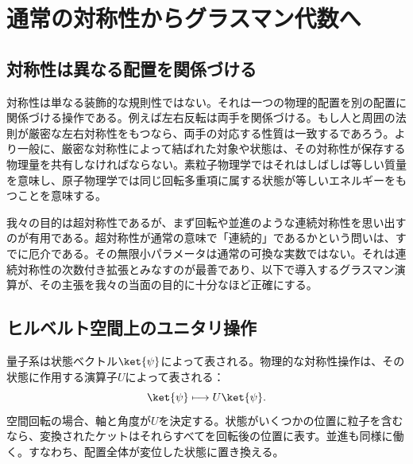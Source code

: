 \chapter{通常の対称性からグラスマン代数へ}


\section{対称性は異なる配置を関係づける}

対称性は単なる装飾的な規則性ではない。それは一つの物理的配置を別の配置に関係づける操作である。例えば左右反転は両手を関係づける。もし人と周囲の法則が厳密な左右対称性をもつなら、両手の対応する性質は一致するであろう。より一般に、厳密な対称性によって結ばれた対象や状態は、その対称性が保存する物理量を共有しなければならない。素粒子物理学ではそれはしばしば等しい質量を意味し、原子物理学では同じ回転多重項に属する状態が等しいエネルギーをもつことを意味する。

我々の目的は超対称性であるが、まず回転や並進のような連続対称性を思い出すのが有用である。超対称性が通常の意味で「連続的」であるかという問いは、すでに厄介である。その無限小パラメータは通常の可換な実数ではない。それは連続対称性の次数付き拡張とみなすのが最善であり、以下で導入するグラスマン演算が、その主張を我々の当面の目的に十分なほど正確にする。

\section{ヒルベルト空間上のユニタリ操作}

量子系は状態ベクトル\(\ket{\psi}\)によって表される。物理的な対称性操作は、その状態に作用する演算子\(U\)によって表される：
\begin{equation}
\ket{\psi}\longmapsto U\ket{\psi}.
\end{equation}
空間回転の場合、軸と角度が\(U\)を決定する。状態がいくつかの位置に粒子を含むなら、変換されたケットはそれらすべてを回転後の位置に表す。並進も同様に働く。すなわち、配置全体が変位した状態に置き換える。

